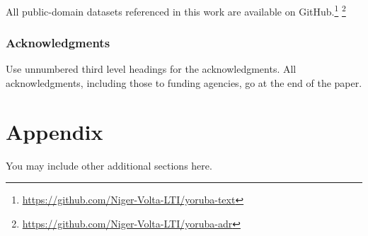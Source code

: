 \documentclass{article} %
\begin{document}
All public-domain datasets referenced in this work are available on GitHub.\footnote{\url{https://github.com/Niger-Volta-LTI/yoruba-text}} \footnote{\url{https://github.com/Niger-Volta-LTI/yoruba-adr}}

\subsubsection*{Acknowledgments}
Use unnumbered third level headings for the acknowledgments. All
acknowledgments, including those to funding agencies, go at the end of the paper.





\appendix
\section{Appendix}
You may include other additional sections here. 
\end{document}
